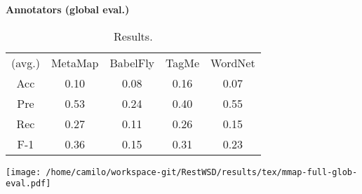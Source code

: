 \begin{center}\textbf{\Large Annotators (global eval.)}\end{center}
\begin{center}\begin{table}[p]\centering
\begin{tabular}{ccccc}
(avg.) & MetaMap & BabelFly & TagMe & WordNet\\ 
Acc & 0.10 & 0.08 & 0.16 & 0.07\\ 
Pre & 0.53 & 0.24 & 0.40 & 0.55\\ 
Rec & 0.27 & 0.11 & 0.26 & 0.15\\ 
F-1 & 0.36 & 0.15 & 0.31 & 0.23\\ 

\end{tabular}\caption{Results.}\end{table}\end{center}



\vspace{0.2cm}

\begin{center}
\texttt{[image: /home/camilo/workspace-git/RestWSD/results/tex/mmap-full-glob-eval.pdf]}
\end{center}
\newpage
